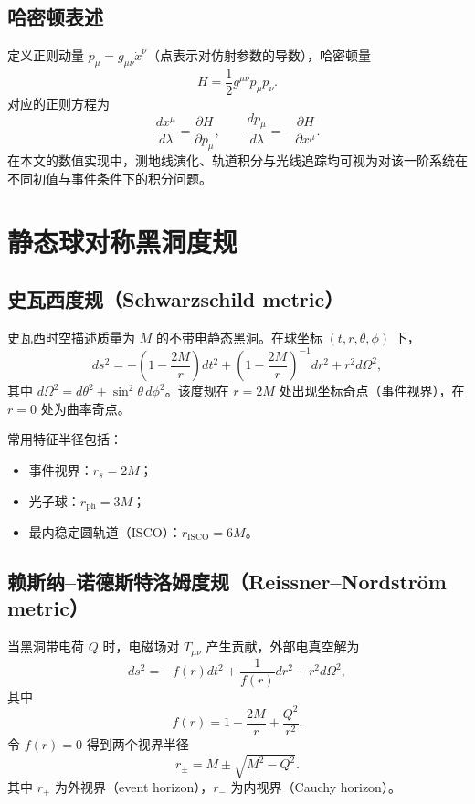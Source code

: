 \documentclass[a4paper,12pt]{article}
\numberwithin{equation}{section}
\begin{document}
\subsection{哈密顿表述}

定义正则动量 $p_\mu=g_{\mu\nu}\dot{x}^\nu$（点表示对仿射参数的导数），哈密顿量
\begin{equation}
H=\frac{1}{2}g^{\mu\nu}p_\mu p_\nu.
\end{equation}
对应的正则方程为
\begin{equation}
\frac{dx^\mu}{d\lambda}=\frac{\partial H}{\partial p_\mu},\qquad
\frac{dp_\mu}{d\lambda}=-\frac{\partial H}{\partial x^\mu}.
\end{equation}
在本文的数值实现中，测地线演化、轨道积分与光线追踪均可视为对该一阶系统在不同初值与事件条件下的积分问题。

\section{静态球对称黑洞度规}

\subsection{史瓦西度规（Schwarzschild metric）}

史瓦西时空描述质量为 $M$ 的不带电静态黑洞。在球坐标 $(t,r,\theta,\phi)$ 下，
\begin{equation}
ds^2=-\left(1-\frac{2M}{r}\right)dt^2+\left(1-\frac{2M}{r}\right)^{-1}dr^2+r^2d\Omega^2,
\end{equation}
其中 $d\Omega^2=d\theta^2+\sin^2\theta\,d\phi^2$。该度规在 $r=2M$ 处出现坐标奇点（事件视界），在 $r=0$ 处为曲率奇点。

常用特征半径包括：
\begin{itemize}
\item 事件视界：$r_s=2M$；
\item 光子球：$r_{\mathrm{ph}}=3M$；
\item 最内稳定圆轨道（ISCO）：$r_{\mathrm{ISCO}}=6M$。
\end{itemize}

\subsection{赖斯纳--诺德斯特洛姆度规（Reissner--Nordström metric）}

当黑洞带电荷 $Q$ 时，电磁场对 $T_{\mu\nu}$ 产生贡献，外部电真空解为
\begin{equation}
ds^2=-f(r)dt^2+\frac{1}{f(r)}dr^2+r^2d\Omega^2,
\end{equation}
其中
\begin{equation}
f(r)=1-\frac{2M}{r}+\frac{Q^2}{r^2}.
\end{equation}
令 $f(r)=0$ 得到两个视界半径
\begin{equation}
r_{\pm}=M\pm\sqrt{M^2-Q^2}.
\end{equation}
其中 $r_+$ 为外视界（event horizon），$r_-$ 为内视界（Cauchy horizon）。
\end{document}
